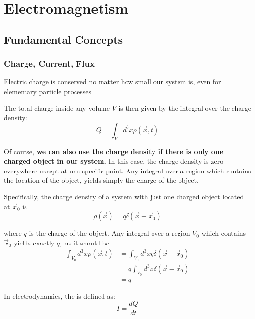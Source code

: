 \chapter{Electromagnetism}
\section{Fundamental Concepts}
\subsection{Charge, Current, Flux}
\begin{qt}
    \begin{center}
        Electric charge is conserved no matter how small our system is, even for elementary particle processes
    \end{center}
\end{qt}
\begin{qt}
    The total charge inside any volume $V$ is then given by the integral over the charge density:
    \begin{equation}
Q=\int_{V} d^{3} x \rho(\vec{x}, t)
\end{equation}
\end{qt}
Of course, \textbf{we can also use the charge density if there is only one charged object in our system.} In this case, the charge density is zero everywhere except at one specific point. Any integral over a region which contains the location of the object, yields simply the charge of the object. 
\begin{qt}
    Specifically, the charge density of a system with just one charged object located at $\vec{x}_{0}$ is
    \begin{equation}
\rho(\vec{x})=q \delta\left(\vec{x}-\vec{x}_{0}\right)
\end{equation}
\end{qt}
where $q$ is the charge of the object. Any integral over a region $V_{0}$ which contains $\vec{x}_{0}$ yields exactly $q,$ as it should be
$$
\begin{aligned}
\int_{V_{0}} d^{3} x \rho(\vec{x}, t) &=\int_{V_{0}} d^{3} x q \delta\left(\vec{x}-\vec{x}_{0}\right) \\
&=q \int_{V_{0}} d^{3} x \delta\left(\vec{x}-\vec{x}_{0}\right) \\
&=q
\end{aligned}
$$
\begin{qt}
    In electrodynamics, the  is defined as:
    \begin{equation}
I=\frac{d Q}{d t}
\end{equation}
\end{qt}
